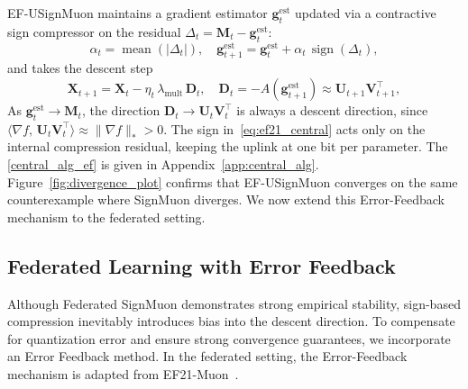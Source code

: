 \documentclass{article}
\begin{document}
EF-USignMuon maintains a gradient estimator $\mathbf{g}_t^{\mathrm{est}}$ updated via a contractive sign compressor on the residual $\Delta_t = \mathbf{M}_t - \mathbf{g}_t^{\mathrm{est}}$: 
\begin{equation}
\alpha_t = \operatorname{mean}(|\Delta_t|),\quad
\mathbf{g}_{t+1}^{\mathrm{est}} = \mathbf{g}_t^{\mathrm{est}} + \alpha_t\,\operatorname{sign}(\Delta_t),
\label{eq:ef21_central}
\end{equation}
and takes the descent step
\begin{equation}
\mathbf{X}_{t+1} = \mathbf{X}_t - \eta_t\,\lambda_{\mathrm{mult}}\,\mathbf{D}_t,
\quad \mathbf{D}_t = -A(\mathbf{g}_{t+1}^{\mathrm{est}}) \approx \mathbf{U}_{t+1}\mathbf{V}^\top_{t+1},
\label{eq:ef_step}
\end{equation}
As $\mathbf{g}_t^{\mathrm{est}}\to\mathbf{M}_t$, the direction
$\mathbf{D}_t \to \mathbf{U}_t\mathbf{V}_t^\top$ is always a descent direction,
since $\langle\nabla f,\,\mathbf{U}_t\mathbf{V}_t^\top\rangle \approx \|\nabla f\|_* > 0$.
The sign in~\eqref{eq:ef21_central} acts only on the internal compression residual, keeping the uplink at one bit per parameter. The \cref{central_alg_ef} is given in Appendix~\ref{app:central_alg}. Figure~\ref{fig:divergence_plot} confirms that EF-USignMuon converges on the same counterexample where SignMuon diverges. We now extend this Error-Feedback mechanism to the federated setting.

\subsection{Federated Learning with Error Feedback}
Although Federated SignMuon demonstrates strong empirical stability, sign-based compression inevitably introduces bias into the descent direction. To compensate for quantization error and ensure strong convergence guarantees, we incorporate an Error Feedback method. In the federated setting, the Error-Feedback mechanism is adapted from EF21-Muon~\cite{gruntkowska2025error}. 
\end{document}
